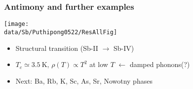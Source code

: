 \begin{frame}[label=SbRes]
\frametitle{Antimony and further examples}


\centerline{\texttt{[image: \\data/Sb/Puthipong0522/ResAllFig]}}


\begin{itemize}
\item Structural transition (Sb-II $\rightarrow$ Sb-IV)
\item $T_c \simeq 3.5 ~ \text{K}$,  $\rho(T)\propto T^2$ at low $T$ $\leftarrow$ damped phonons(?)
\item Next: Ba, Rb, K, Sc, As, Sr, Nowotny phases

\end{itemize}

\end{frame}

